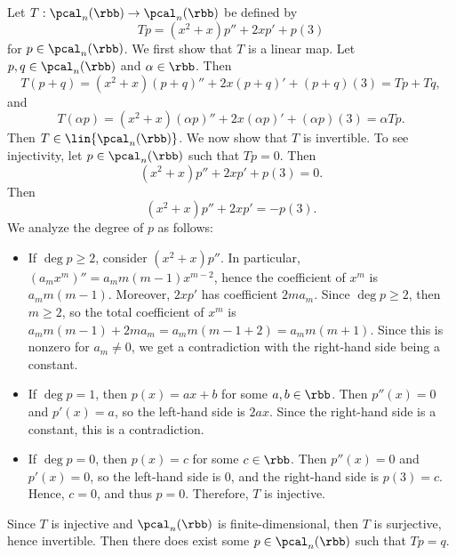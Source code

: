 \begin{sol}
    Let $T : \pcal_n(\rbb) \to \pcal_n(\rbb)$ be defined by
    \[
    	Tp = (x^2 + x) p'' + 2x p' + p(3)
    \]
    for $p \in \pcal_n(\rbb)$.
	We first show that $T$ is a linear map.
	Let $p, q \in \pcal_n(\rbb)$ and $\alpha \in \rbb$.
	Then
    \[
    	T(p + q) = (x^2 + x) (p + q)'' + 2x (p + q)' + (p + q)(3) = Tp + Tq,
    \]
    and
    \[
    	T(\alpha p) = (x^2 + x) (\alpha p)'' + 2x (\alpha p)' + (\alpha p)(3) = \alpha Tp.
    \]
    Then $T \in \lin{\pcal_n(\rbb)}$.
	We now show that $T$ is invertible.
	To see injectivity, let $p \in \pcal_n(\rbb)$ such that $Tp = 0$.
	Then
    \[
    	(x^2 + x) p'' + 2x p' + p(3) = 0.
    \]
    Then
    \[
    	(x^2 + x) p'' + 2x p' = -p(3).
    \]
    We analyze the degree of $p$ as follows:
    \begin{itemize}
        \item If $\deg p \geq 2$, consider $(x^2 + x)p''$.
	In particular, $(a_m x^m)'' = a_m m(m - 1)x^{m - 2}$, hence the coefficient of $x^m$ is $a_m m(m - 1)$.
	Moreover, $2xp'$ has coefficient $2m a_m$.
	Since $\deg p \geq 2$, then $m \geq 2$, so the total coefficient of $x^m$ is $a_m m(m - 1) + 2m a_m = a_m m(m - 1 + 2) = a_m m(m + 1)$.
	Since this is nonzero for $a_m \neq 0$, we get a contradiction with the right-hand side being a constant.
        \item If $\deg p = 1$, then $p(x) = ax + b$ for some $a, b \in \rbb$.
	Then $p''(x) = 0$ and $p'(x) = a$, so the left-hand side is $2ax$.
	Since the right-hand side is a constant, this is a contradiction.
        \item If $\deg p = 0$, then $p(x) = c$ for some $c \in \rbb$.
	Then $p''(x) = 0$ and $p'(x) = 0$, so the left-hand side is 0, and the right-hand side is $p(3) = c$.
	Hence, $c = 0$, and thus $p = 0$.
	Therefore, $T$ is injective.
    \end{itemize}
    Since $T$ is injective and $\pcal_n(\rbb)$ is finite-dimensional, then $T$ is surjective, hence invertible.
	Then there does exist some $p \in \pcal_n(\rbb)$ such that $Tp = q$.
\end{sol}

